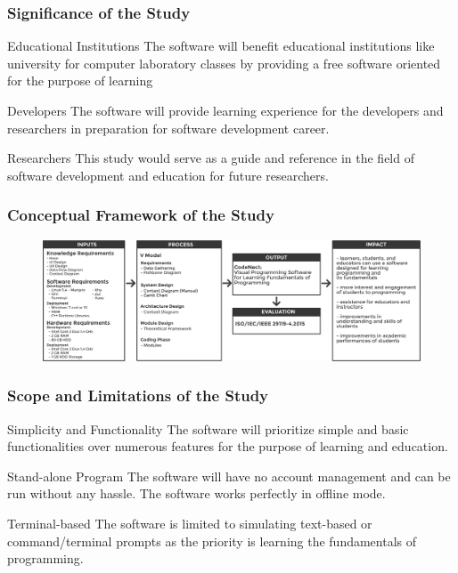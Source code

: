 \documentclass[handout]{beamer}
\begin{document}
\begin{frame}
	\frametitle{Significance of the Study}
	\begin{block}{Educational Institutions}
		The software will benefit educational institutions like university for computer
		laboratory classes by providing a free software oriented for the purpose of
		learning
	\end{block}

	\begin{block}{Developers}
		The software will provide learning experience for the developers and researchers
		in preparation for software development career.
	\end{block}

	\begin{block}{Researchers}
		This study would serve as a guide and reference in the field of software
		development and education for future researchers.
	\end{block}
\end{frame}

\begin{frame}
	\frametitle{Conceptual Framework of the Study}
	\begin{figure}
		\includegraphics[width=1\textwidth]{figures/conceptual_framework.png}
	\end{figure}
\end{frame}

\begin{frame}
	\frametitle{Scope and Limitations of the Study}
	\begin{block}{Simplicity and Functionality}
		The software will prioritize simple and basic functionalities over numerous
		features for the purpose of learning and education.
	\end{block}
	\begin{block}{Stand-alone Program}
		The software will have no account management and can be run without any
		hassle. The software works perfectly in offline mode.
	\end{block}
	\begin{block}{Terminal-based}
		The software is limited to simulating text-based or command/terminal
		prompts as the priority is learning the fundamentals of programming.
	\end{block}
\end{frame}
\end{document}
